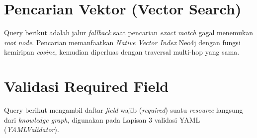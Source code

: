 \section{Pencarian Vektor (Vector Search)}

Query berikut adalah jalur \textit{fallback} saat pencarian \textit{exact match} gagal menemukan \textit{root node}. Pencarian memanfaatkan \textit{Native Vector Index} Neo4j dengan fungsi kemiripan \textit{cosine}, kemudian diperluas dengan traversal multi-hop yang sama.



\section{Validasi Required Field}

Query berikut mengambil daftar \textit{field} wajib (\textit{required}) suatu \textit{resource} langsung dari \textit{knowledge graph}, digunakan pada Lapisan 3 validasi YAML (\textit{YAMLValidator}).


